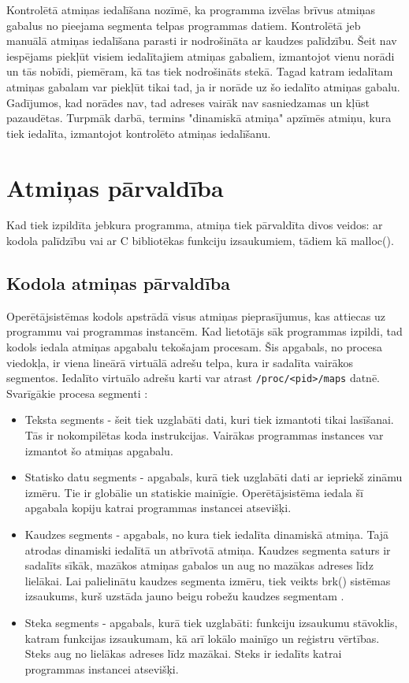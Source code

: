 Kontrolētā atmiņas iedalīšana nozīmē, ka programma izvēlas brīvus atmiņas gabalus no pieejama segmenta telpas programmas datiem. 
Kontrolētā jeb manuālā atmiņas iedalīšana parasti ir nodrošināta ar kaudzes palīdzību.
Šeit nav iespējams piekļūt visiem iedalītajiem atmiņas gabaliem, izmantojot vienu norādi un tās nobīdi, piemēram, kā tas tiek nodrošināts stekā. 
Tagad katram iedalītam atmiņas gabalam var piekļūt tikai tad, ja ir norāde uz šo iedalīto atmiņas gabalu. 
Gadījumos, kad norādes nav, tad adreses vairāk nav sasniedzamas un kļūst pazaudētas.
Turpmāk darbā, termins "dinamiskā atmiņa" apzīmēs atmiņu, kura tiek iedalīta, izmantojot kontrolēto atmiņas iedalīšanu.


\section{Atmiņas pārvaldība}
Kad tiek izpildīta jebkura programma, atmiņa tiek pārvaldīta divos veidos: ar kodola palīdzību vai ar C bibliotēkas funkciju izsaukumiem, tādiem kā malloc().

\subsection{Kodola atmiņas pārvaldība}
Operētājsistēmas kodols apstrādā visus atmiņas pieprasījumus, kas attiecas uz programmu vai programmas instancēm.
Kad lietotājs sāk programmas izpildi, tad kodols iedala atmiņas apgabalu tekošajam procesam.
Šis apgabals, no procesa viedokļa, ir viena lineārā virtuālā adrešu telpa, kura ir sadalīta vairākos segmentos.
Iedalīto virtuālo adrešu karti var atrast \texttt{/proc/<pid>/maps} datnē.
Svarīgākie procesa segmenti  \cite {PETRSOF}:
\begin{itemize}
	\item   Teksta segments - šeit tiek uzglabāti dati, kuri tiek izmantoti tikai lasīšanai. Tās ir nokompilētas koda instrukcijas. 
    Vairākas programmas instances var izmantot šo atmiņas apgabalu.
    \item Statisko datu segments - apgabals, kurā tiek uzglabāti dati ar iepriekš zināmu izmēru. Tie ir globālie un statiskie mainīgie.
    Operētājsistēma iedala šī apgabala kopiju katrai programmas instancei atsevišķi.
    \item Kaudzes segments - apgabals, no kura tiek iedalīta dinamiskā atmiņa.
    Tajā atrodas dinamiski iedalītā un atbrīvotā atmiņa. Kaudzes segmenta saturs ir sadalīts sīkāk, mazākos atmiņas gabalos un aug no mazākas adreses līdz lielākai.  Lai palielinātu kaudzes segmenta izmēru, tiek veikts brk() sistēmas izsaukums, kurš uzstāda jauno beigu robežu kaudzes segmentam \cite{LINMAN}. 
    \item Steka segments - apgabals, kurā tiek uzglabāti: funkciju izsaukumu stāvoklis, katram funkcijas izsaukumam, kā arī lokālo mainīgo un reģistru vērtības. 
    Steks aug no lielākas adreses līdz mazākai. 
    Steks ir iedalīts katrai programmas instancei atsevišķi.
\end{itemize} 

